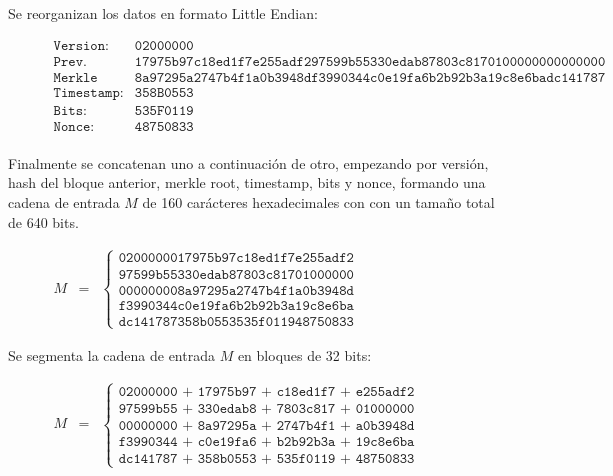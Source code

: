 \documentclass{article}
\begin{document}
    Se reorganizan los datos en formato Little Endian:
    \begin{figure}[H]
    \centering
    \scriptsize{
        $\begin{array}{ll}
            \texttt{Version:} & \texttt{02000000} \\
            \texttt{Prev. Block:} & \texttt{17975b97c18ed1f7e255adf297599b55330edab87803c8170100000000000000} \\
            \texttt{Merkle root:} & \texttt{8a97295a2747b4f1a0b3948df3990344c0e19fa6b2b92b3a19c8e6badc141787} \\
            \texttt{Timestamp:} & \texttt{358B0553} \\
            \texttt{Bits:} & \texttt{535F0119} \\
            \texttt{Nonce:} & \texttt{48750833} \\
        \end{array}$
    }
    \end{figure}
    
    Finalmente se concatenan uno a continuación de otro, empezando por versión, hash del bloque anterior, merkle root, timestamp, bits y nonce, formando una cadena de entrada $M$ de 160 carácteres hexadecimales con con un tamaño total de 640 bits.
    
    \begin{figure}[H]
    \centering
        $\begin{array}{rcl}
             M & = & \left \{
            \begin{array}{c}
                \texttt{0200000017975b97c18ed1f7e255adf2} \\
                \texttt{97599b55330edab87803c81701000000} \\
                \texttt{000000008a97295a2747b4f1a0b3948d} \\
                \texttt{f3990344c0e19fa6b2b92b3a19c8e6ba} \\
                \texttt{dc141787358b0553535f011948750833}
            \end{array}
            \right .
        \end{array}$
    \end{figure}
    
    Se segmenta la cadena de entrada $M$ en bloques de 32 bits:
    \begin{figure}[H]
    \centering
        $\begin{array}{rcl}
             M & = & \left \{
            \begin{array}{c}
                \texttt{02000000 + 17975b97 + c18ed1f7 + e255adf2} \\
                \texttt{97599b55 + 330edab8 + 7803c817 + 01000000} \\
                \texttt{00000000 + 8a97295a + 2747b4f1 + a0b3948d} \\
                \texttt{f3990344 + c0e19fa6 + b2b92b3a + 19c8e6ba} \\
                \texttt{dc141787 + 358b0553 + 535f0119 + 48750833}
            \end{array}
            \right .
        \end{array}$
    \end{figure}
    
\end{document}
